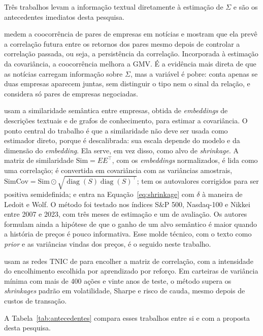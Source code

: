 Três trabalhos levam a informação textual diretamente à estimação de $\Sigma$ e são os antecedentes
imediatos desta pesquisa.

\citet{tang2019} medem a coocorrência de pares de empresas em notícias e mostram que ela prevê a
correlação futura entre os retornos dos pares mesmo depois de controlar a correlação passada, ou seja,
a persistência da correlação. Incorporada à estimação da covariância, a coocorrência melhora a GMV. É a
evidência mais direta de que as notícias carregam informação sobre $\Sigma$, mas a variável é pobre:
conta apenas se duas empresas aparecem juntas, sem distinguir o tipo nem o sinal da relação, e
considera só pares de empresas negociadas.

\citet{becquin2023} usam a similaridade semântica entre empresas, obtida de \emph{embeddings} de
descrições textuais e de grafos de conhecimento, para estimar a covariância. O ponto central do trabalho
é que a similaridade não deve ser usada como estimador direto, porque é descalibrada: sua escala
depende do modelo e da dimensão do \emph{embedding}. Ela serve, em vez disso, como alvo de
\emph{shrinkage}. A matriz de similaridade $\mathrm{Sim}=EE^\top$, com os \emph{embeddings} normalizados,
é lida como uma correlação; é convertida em covariância com as variâncias amostrais, $\mathrm{SimCov} =
\mathrm{Sim}\odot\sqrt{\operatorname{diag}(S)\operatorname{diag}(S)^\top}$; tem os autovalores corrigidos
para ser positiva semidefinida; e entra na Equação~\eqref{eq:shrinkage} com $\delta$ à maneira de
Ledoit e Wolf. O método foi testado nos índices S\&P 500, Nasdaq-100 e Nikkei entre 2007 e 2023, com
três meses de estimação e um de avaliação. Os autores formulam ainda a hipótese de que o ganho de um alvo
semântico é maior quando a história de preços é pouco informativa. Esse molde técnico, com o texto como
\emph{prior} e as variâncias vindas dos preços, é o seguido neste trabalho.

\citet{lu2024} usam as redes TNIC de \citet{hoberg2016} para encolher a matriz de correlação, com a
intensidade do encolhimento escolhida por aprendizado por reforço. Em carteiras de variância mínima com
mais de 400 ações e vinte anos de teste, o método supera os \emph{shrinkages} padrão em volatilidade,
Sharpe e risco de cauda, mesmo depois de custos de transação.

A Tabela~\ref{tab:antecedentes} compara esses trabalhos entre si e com a proposta desta pesquisa.

